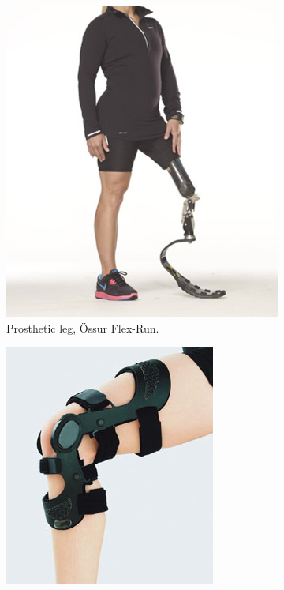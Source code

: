 \begin{figure}[htb]
	\centering
    \begin{subfigure}[b]{0.31\textwidth}
        \includegraphics[width=\textwidth]{figures/prosthetic_leg.png}
        \caption{Prosthetic leg, Össur Flex-Run.}
        \label{fig:prosthetic_leg}
    \end{subfigure}
    \centering
    \begin{subfigure}[b]{0.31\textwidth}
        \includegraphics[width=\textwidth]{figures/orthotic_leg.jpg}

\end{subfigure}
\end{figure}
